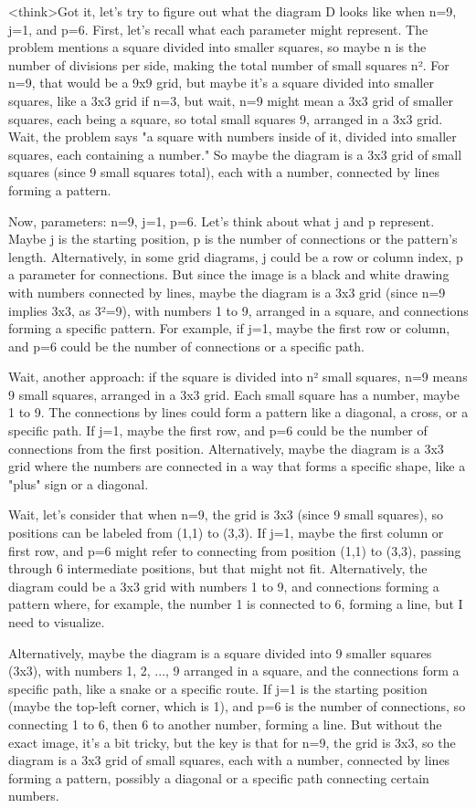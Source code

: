 <think>Got it, let's try to figure out what the diagram D looks like when n=9, j=1, and p=6. First, let's recall what each parameter might represent. The problem mentions a square divided into smaller squares, so maybe n is the number of divisions per side, making the total number of small squares n². For n=9, that would be a 9x9 grid, but maybe it's a square divided into smaller squares, like a 3x3 grid if n=3, but wait, n=9 might mean a 3x3 grid of smaller squares, each being a square, so total small squares 9, arranged in a 3x3 grid. Wait, the problem says "a square with numbers inside of it, divided into smaller squares, each containing a number." So maybe the diagram is a 3x3 grid of small squares (since 9 small squares total), each with a number, connected by lines forming a pattern.

Now, parameters: n=9, j=1, p=6. Let's think about what j and p represent. Maybe j is the starting position, p is the number of connections or the pattern's length. Alternatively, in some grid diagrams, j could be a row or column index, p a parameter for connections. But since the image is a black and white drawing with numbers connected by lines, maybe the diagram is a 3x3 grid (since n=9 implies 3x3, as 3²=9), with numbers 1 to 9, arranged in a square, and connections forming a specific pattern. For example, if j=1, maybe the first row or column, and p=6 could be the number of connections or a specific path.

Wait, another approach: if the square is divided into n² small squares, n=9 means 9 small squares, arranged in a 3x3 grid. Each small square has a number, maybe 1 to 9. The connections by lines could form a pattern like a diagonal, a cross, or a specific path. If j=1, maybe the first row, and p=6 could be the number of connections from the first position. Alternatively, maybe the diagram is a 3x3 grid where the numbers are connected in a way that forms a specific shape, like a "plus" sign or a diagonal.

Wait, let's consider that when n=9, the grid is 3x3 (since 9 small squares), so positions can be labeled from (1,1) to (3,3). If j=1, maybe the first column or first row, and p=6 might refer to connecting from position (1,1) to (3,3), passing through 6 intermediate positions, but that might not fit. Alternatively, the diagram could be a 3x3 grid with numbers 1 to 9, and connections forming a pattern where, for example, the number 1 is connected to 6, forming a line, but I need to visualize.

Alternatively, maybe the diagram is a square divided into 9 smaller squares (3x3), with numbers 1, 2, ..., 9 arranged in a square, and the connections form a specific path, like a snake or a specific route. If j=1 is the starting position (maybe the top-left corner, which is 1), and p=6 is the number of connections, so connecting 1 to 6, then 6 to another number, forming a line. But without the exact image, it's a bit tricky, but the key is that for n=9, the grid is 3x3, so the diagram is a 3x3 grid of small squares, each with a number, connected by lines forming a pattern, possibly a diagonal or a specific path connecting certain numbers.

